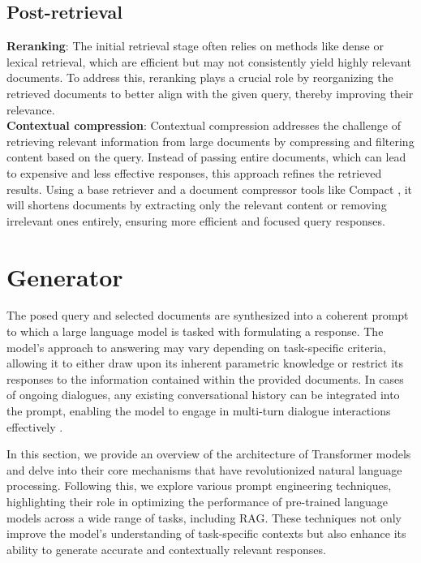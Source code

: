 \subsection{Post-retrieval}

\textbf{Reranking}: The initial retrieval stage often relies on methods like dense or lexical retrieval, which are efficient but may not consistently yield highly relevant documents. To address this, reranking plays a crucial role by reorganizing the retrieved documents to better align with the given query, thereby improving their relevance.\\

\textbf{Contextual compression}: Contextual compression addresses the challenge of retrieving relevant information from large documents by compressing and filtering content based on the query. Instead of passing entire documents, which can lead to expensive and less effective responses, this approach refines the retrieved results. Using a base retriever and a document compressor tools like Compact \cite{yoon2024compact}, it will shortens documents by extracting only the relevant content or removing irrelevant ones entirely, ensuring more efficient and focused query responses.

\section{Generator}

The posed query and selected documents are synthesized into a coherent prompt to which a large language model is tasked with formulating a response. The model’s approach to answering may vary depending on task-specific criteria, allowing it to either draw upon its inherent parametric knowledge or restrict its responses to the information contained within the provided documents. In cases of ongoing dialogues, any existing conversational history can be integrated into the prompt, enabling the model to engage in multi-turn dialogue interactions effectively  \cite{gao2023ragllmsurvey}.


In this section, we provide an overview of the architecture of Transformer models \cite{vaswani2017} and delve into their core mechanisms that have revolutionized natural language processing. Following this, we explore various prompt engineering techniques, highlighting their role in optimizing the performance of pre-trained language models across a wide range of tasks, including RAG. These techniques not only improve the model's understanding of task-specific contexts but also enhance its ability to generate accurate and contextually relevant responses.

